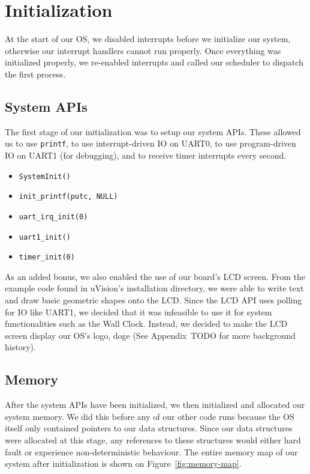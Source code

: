 \documentclass[12pt]{article}
\begin{document}
\section{Initialization}
At the start of our OS, we disabled interrupts before we initialize our system, otherwise our interrupt handlers cannot run properly. Once everything was initialized properly, we re-enabled interrupts and called our scheduler to dispatch the first process.

\subsection{System APIs}
The first stage of our initialization was to setup our system APIs. These allowed us to use \texttt{printf}, to use interrupt-driven IO on UART0, to use program-driven IO on UART1 (for debugging), and to receive timer interrupts every second.

\begin{itemize}
	\item \texttt{SystemInit()}
	\item \texttt{init\_printf(putc, NULL)}	
	\item \texttt{uart\_irq\_init(0)}
	\item \texttt{uart1\_init()}
	\item \texttt{timer\_init(0)}
\end{itemize}

As an added bonus, we also enabled the use of our board's LCD screen. From the example code found in uVision's installation directory, we were able to write text and draw basic geometric shapes onto the LCD. Since the LCD API uses polling for IO like UART1, we decided that it was infeasible to use it for system functionalities such as the Wall Clock. Instead, we decided to make the LCD screen display our OS's logo, doge (See Appendix~TODO for more background history).


\subsection{Memory}
After the system APIs have been initialized, we then initialized and allocated our system memory. We did this before any of our other code runs because the OS itself only contained pointers to our data structures. Since our data structures were allocated at this stage, any references to these structures would either hard fault or experience non-deterministic behaviour. The entire memory map of our system after initialization is shown on Figure~\ref{fig:memory-map}. 
\end{document}
